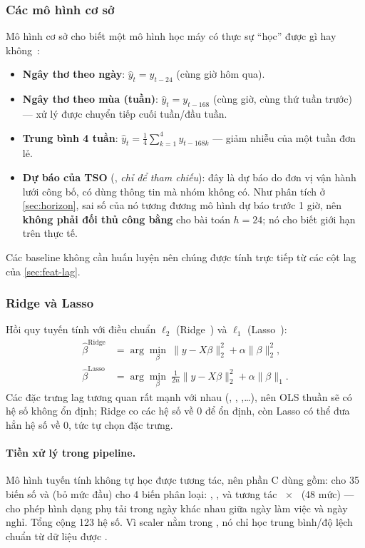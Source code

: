 \subsubsection{Các mô hình cơ sở}\label{sec:baselines}

Mô hình cơ sở cho biết một mô hình học máy có thực sự ``học'' được gì hay không~\cite{hyndman2021fpp3}:
\begin{itemize}
  \item \textbf{Ngây thơ theo ngày}: $\hat y_t = y_{t-24}$ (cùng giờ hôm qua).
  \item \textbf{Ngây thơ theo mùa (tuần)}: $\hat y_t = y_{t-168}$ (cùng giờ, cùng thứ tuần trước) --- xử lý
        được chuyển tiếp cuối tuần/đầu tuần.
  \item \textbf{Trung bình 4 tuần}: $\hat y_t = \frac14\sum_{k=1}^4 y_{t-168k}$ --- giảm nhiễu của một tuần đơn lẻ.
  \item \textbf{Dự báo của TSO} (, \emph{chỉ để tham chiếu}): đây là dự báo do đơn vị
        vận hành lưới công bố, có dùng thông tin mà nhóm không có. Như phân tích ở \cref{sec:horizon}, sai số
        của nó tương đương mô hình dự báo trước 1 giờ, nên \textbf{không phải đối thủ công bằng} cho bài toán
        $h=24$; nó cho biết giới hạn trên thực tế.
\end{itemize}
Các baseline không cần huấn luyện nên chúng được tính trực tiếp từ các cột lag của \cref{sec:feat-lag}.

\subsubsection{Ridge và Lasso}\label{sec:linear}

Hồi quy tuyến tính với điều chuẩn $\ell_2$ (Ridge~\cite{hoerl1970ridge}) và $\ell_1$ (Lasso~\cite{tibshirani1996lasso}):
\begin{align}
\hat\beta^{\text{Ridge}} &= \arg\min_\beta\ \|y - X\beta\|_2^2 + \alpha\|\beta\|_2^2,\\
\hat\beta^{\text{Lasso}} &= \arg\min_\beta\ \tfrac{1}{2n}\|y - X\beta\|_2^2 + \alpha\|\beta\|_1.
\end{align}
Các đặc trưng lag tương quan rất mạnh với nhau (, , ,\dots),
nên OLS thuần sẽ có hệ số không ổn định; Ridge co các hệ số về 0 để ổn định, còn Lasso có thể đưa hẳn hệ số về
0, tức tự chọn đặc trưng.

\paragraph{Tiền xử lý trong pipeline.} Mô hình tuyến tính không tự học được tương tác, nên phần C dùng
 gồm:  cho 35 biến số và  (bỏ mức đầu) cho
4 biến phân loại: , ,  và tương tác
~$\times$~ (48 mức) --- cho phép hình dạng phụ tải trong ngày khác nhau giữa
ngày làm việc và ngày nghỉ. Tổng cộng 123 hệ số. Vì scaler nằm trong , nó chỉ học trung bình/độ
lệch chuẩn từ dữ liệu được .

